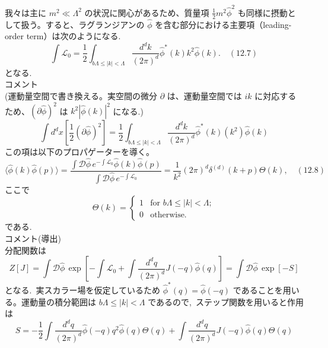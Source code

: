 \documentclass[uplatex,dvipdfmx]{jsarticle}
\begin{document}
我々は主に $m^2 \ll \Lambda^2$ の状況に関心があるため、質量項 $\frac{1}{2}m^2 \hat{\phi}^2$ も同様に摂動として扱う。すると、ラグランジアンの $\hat{\phi}$ を含む部分における主要項（leading-order term）は次のようになる.
\begin{equation}
    \int \mathcal{L}_0 = \frac{1}{2} \int_{b\Lambda \le |k| < \Lambda} \frac{d^d k}{(2\pi)^d} \hat{\phi}^*(k) k^2 \hat{\phi}(k). \quad (12.7)
\end{equation}
となる.\\
コメント\\
(運動量空間で書き換える。実空間の微分 $\partial$ は、運動量空間では $ik$ に対応するため、$(\partial \hat{\phi})^2$ は $k^2 |\hat{\phi}(k)|^2$ になる.)
\begin{equation}
    \int d^d x \left[ \frac{1}{2}(\partial \hat{\phi})^2 \right] = \frac{1}{2} \int_{b\Lambda \le |k| < \Lambda} \frac{d^d k}{(2\pi)^d} \hat{\phi}^*(k) (k^2) \hat{\phi}(k)
\end{equation}
この項は以下のプロパゲーターを導く。
\begin{equation}
    \langle \hat{\phi}(k) \hat{\phi}(p) \rangle = \frac{\int \mathcal{D}\hat{\phi} \, e^{-\int \mathcal{L}_0} \hat{\phi}(k) \hat{\phi}(p)}{\int \mathcal{D}\hat{\phi} \, e^{-\int \mathcal{L}_0}} = \frac{1}{k^2} (2\pi)^d \delta^{(d)}(k+p) \Theta(k), \quad (12.8)
\end{equation}
ここで
\begin{equation}
    \Theta(k) = \begin{cases} 1 & \text{for } b\Lambda \le |k| < \Lambda ; \\ 0 & \text{otherwise.} \end{cases}
\end{equation}
である.\\
コメント(導出)\\
分配関数は
\begin{equation}
    Z[J] = \int \mathcal{D}\hat{\phi} \, \exp\left[ -\int \mathcal{L}_0 + \int \frac{d^d q}{(2\pi)^d} J(-q)\hat{\phi}(q) \right] = \int \mathcal{D}\hat{\phi} \, \exp\left[ -S  \right]
\end{equation}
となる.~実スカラー場を仮定しているため $\hat{\phi}^*(q) = \hat{\phi}(-q)$ であることを用いる。運動量の積分範囲は $b\Lambda \le |k| < \Lambda$ であるので,~ステップ関数を用いると作用は
\begin{equation}
    S = -\frac{1}{2} \int \frac{d^d q}{(2\pi)^d} \hat{\phi}(-q) q^2 \hat{\phi}(q) \Theta(q) + \int \frac{d^d q}{(2\pi)^d} J(-q) \hat{\phi}(q) \Theta(q)
\end{equation}
\end{document}
